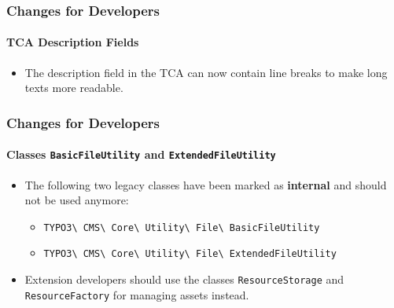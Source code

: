 
\begin{frame}[fragile]
	\frametitle{Changes for Developers}
	\framesubtitle{TCA Description Fields}

	\begin{itemize}
		\item The description field in the TCA can now contain line breaks to make long texts more readable.
	\end{itemize}

\end{frame}


\begin{frame}[fragile]
	\frametitle{Changes for Developers}
	\framesubtitle{Classes \texttt{BasicFileUtility} and \texttt{ExtendedFileUtility}}

	\begin{itemize}
		\item The following two legacy classes have been marked as \textbf{internal}
			and should not be used anymore:

			\begin{itemize}\small
				\item \texttt{TYPO3\textbackslash
					CMS\textbackslash
					Core\textbackslash
					Utility\textbackslash
					File\textbackslash
					BasicFileUtility}
				\item \texttt{TYPO3\textbackslash
					CMS\textbackslash
					Core\textbackslash
					Utility\textbackslash
					File\textbackslash
					ExtendedFileUtility}
			\end{itemize}

		\item Extension developers should use the classes \texttt{ResourceStorage}
			and \texttt{ResourceFactory} for managing assets instead.

	\end{itemize}

\end{frame}


